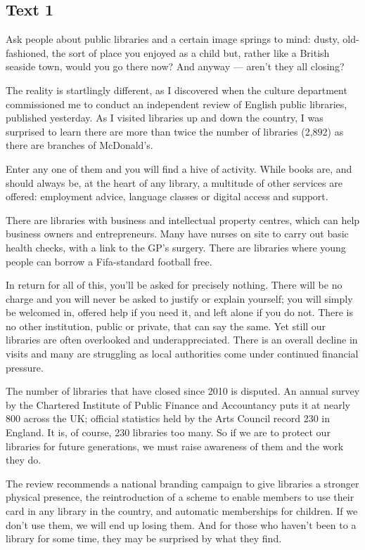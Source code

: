 \documentclass[UTF8,11pt]{ctexart}
\begin{document}
\subsection*{\textbf{Text 1}}


Ask people about public libraries and a certain image springs to mind: dusty, old-fashioned, the sort of place you enjoyed as a child but, rather like a British seaside town, would you go there now? And anyway — aren’t they all closing?


The reality is startlingly different, as I discovered when the culture department commissioned me to conduct an independent review of English public libraries, published yesterday. As I visited libraries up and down the country, I was surprised to learn there are more than twice the number of libraries (2,892) as there are branches of McDonald’s.


Enter any one of them and you will find a hive of activity. While books are, and should always be, at the heart of any library, a multitude of other services are offered: employment advice, language classes or digital access and support.


There are libraries with business and intellectual property centres, which can help business owners and entrepreneurs. Many have nurses on site to carry out basic health checks, with a link to the GP’s surgery. There are libraries where young people can borrow a Fifa-standard football free.


In return for all of this, you’ll be asked for precisely nothing. There will be no charge and you will never be asked to justify or explain yourself; you will simply be welcomed in, offered help if you need it, and left alone if you do not. There is no other institution, public or private, that can say the same. Yet still our libraries are often overlooked and underappreciated. There is an overall decline in visits and many are struggling as local authorities come under continued financial pressure.


The number of libraries that have closed since 2010 is disputed. An annual survey by the Chartered Institute of Public Finance and Accountancy puts it at nearly 800 across the UK; official statistics held by the Arts Council record 230 in England. It is, of course, 230 libraries too many. So if we are to protect our libraries for future generations, we must raise awareness of them and the work they do.


The review recommends a national branding campaign to give libraries a stronger physical presence, the reintroduction of a scheme to enable members to use their card in any library in the country, and automatic memberships for children. If we don’t use them, we will end up losing them. And for those who haven’t been to a library for some time, they may be surprised by what they find.
\end{document}
